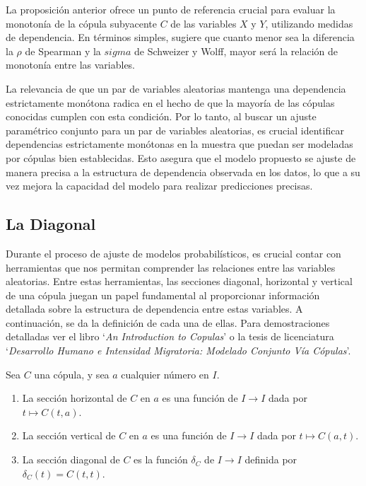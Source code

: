 La proposición anterior ofrece un punto de referencia crucial para evaluar la monotonía de la cópula subyacente $C$ de las variables $X$ y $Y$, utilizando medidas de dependencia. En términos simples, sugiere que cuanto menor sea la diferencia la $\rho$ de Spearman y la $sigma$ de Schweizer y Wolff, mayor será la relación de monotonía entre las variables.

La relevancia de que un par de variables aleatorias mantenga una dependencia estrictamente monótona radica en el hecho de que la mayoría de las cópulas conocidas cumplen con esta condición. Por lo tanto, al buscar un ajuste paramétrico conjunto para un par de variables aleatorias, es crucial identificar dependencias estrictamente monótonas en la muestra que puedan ser modeladas por cópulas bien establecidas. Esto asegura que el modelo propuesto se ajuste de manera precisa a la estructura de dependencia observada en los datos, lo que a su vez mejora la capacidad del modelo para realizar predicciones precisas. \cite[pág. 43]{TesisEmanuel}



\subsection{La Diagonal}

Durante el proceso de ajuste de modelos probabilísticos, es crucial contar con herramientas que nos permitan comprender las relaciones entre las variables aleatorias. Entre estas herramientas, las secciones diagonal, horizontal y vertical de una cópula juegan un papel fundamental al proporcionar información detallada sobre la estructura de dependencia entre estas variables. A continuación, se da la definición de cada una de ellas. Para demostraciones detalladas ver el libro `\textit{An Introduction to Copulas}' \cite{nelsenintroduction} o la tesis de licenciatura `\textit{Desarrollo Humano e Intensidad Migratoria: Modelado Conjunto Vía Cópulas}'.

\begin{defn}
    Sea $C$ una cópula, y sea $a$ cualquier número en $I$. 
    \begin{enumerate}
        \item La sección horizontal de $C$ en $a$ es una función de $I \to I$ dada por $ t \mapsto C(t, a)$. 
        \item La sección vertical de $C$ en $a$ es una función de $I \to I$ dada por $ t \mapsto C(a, t)$.
        \item La sección diagonal de $C$ es la función $\delta_C$ de $I \to I$ definida por $\delta_C(t) = C(t,t)$.
    \end{enumerate}
\end{defn}

